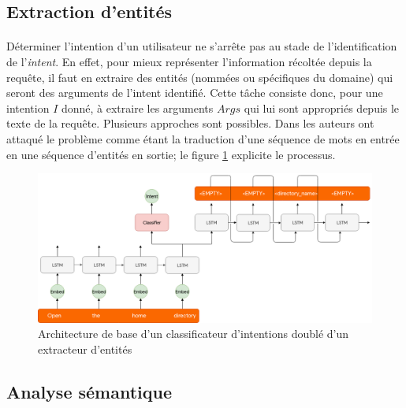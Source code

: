 \subsection{Extraction d'entités}
\paragraph{}
Déterminer l'intention d'un utilisateur ne s'arrête pas au stade de l'identification de l'\textit{intent}. En effet, pour mieux représenter l'information récoltée depuis la requête, il faut en extraire des entités (nommées ou spécifiques du domaine) qui seront des arguments de l'intent identifié. Cette tâche consiste donc, pour une intention $I$ donné, à extraire les arguments $Args$ qui lui sont appropriés depuis le texte de la requête. Plusieurs approches sont possibles. Dans \citep{intent_slots} les auteurs ont attaqué le problème comme étant la traduction d'une séquence de mots en entrée en une séquence d'entités en sortie; le figure \ref{fig:lstmslots} explicite le processus.
\begin{figure}[H]
	\centering
	\includegraphics[width=0.85\linewidth]{images/NLU/seq2seq.png}
	\caption{Architecture de base d'un classificateur d'intentions doublé d'un extracteur d'entités \citep{intent_slots}}
	\label{fig:lstmslots}
\end{figure} 
\subsection{Analyse sémantique}
